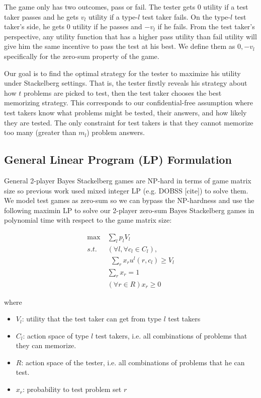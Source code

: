 \documentclass{article}
\begin{document}
The game only has two outcomes, pass or fail. The tester gets $0$ utility if a
test taker passes and he gets $v_l$ utility if a type-$l$ test taker fails. On
the type-$l$ test taker's side, he gets $0$ utility if he passes and $-v_l$ if
he fails. From the test taker's perspective, any utility function that has a
higher pass utility than fail utility will give him the same incentive to pass
the test at his best. We define them as $0, -v_l$ specifically for the zero-sum
property of the game.

Our goal is to find the optimal strategy for the tester to maximize his utility
under Stackelberg settings. That is, the tester firstly reveals his strategy
about how $t$ problems are picked to test, then the test taker chooses the best
memorizing strategy. This corresponds to our confidential-free assumption where
test takers know what problems might be tested, their answers, and how likely
they are tested. The only constraint for test takers is that they cannot
memorize too many (greater than $m_l$) problem answers. 

\subsection{General Linear Program (LP) Formulation}

General 2-player Bayes Stackelberg games are NP-hard in terms of game matrix
size so previous work used mixed integer LP (e.g. DOBSS [cite]) to solve them.
We model test games as zero-sum so we can bypass the NP-hardness and use the
following maximin LP to solve our 2-player zero-sum Bayes Stackelberg games in
polynomial time with respect to the game matrix size:

\begin{align}\label{eqn:maximin}
	\max~ &\sum_l p_l V_l \\
	s.t.~ &(\forall l, \forall c_l \in C_l),\nonumber\\
	&~~ \sum_r x_r u^l(r, c_l) \geq V_l\nonumber\\
	&\sum_r x_r = 1\nonumber\\
	&(\forall r \in R) x_r \geq 0\nonumber
\end{align}

where 
\begin{itemize}

 \item $V_l$: utility that the test taker can get from type $l$ test takers

 \item $C_l$: action space of type $l$ test takers, i.e. all combinations of
 problems that they can memorize.

 \item $R$: action space of the tester, i.e. all combinations of problems that
 he can test.
 
 \item $x_r$: probability to test problem set $r$

\end{itemize}
\end{document}
